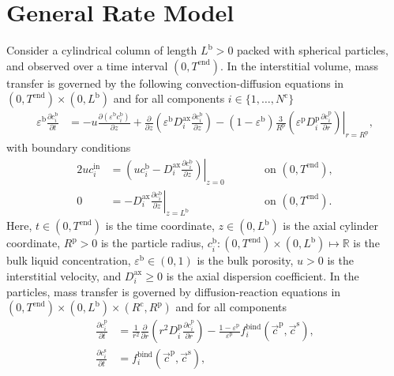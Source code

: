 \documentclass{article}
\begin{document}
\section*{General Rate Model}
Consider a cylindrical column of length $L^{\mathrm{b}} > 0$ packed with spherical particles, and observed over a time interval $(0, T^{\mathrm{end}})$.
In the interstitial volume, mass transfer is governed by the following convection-diffusion equations in $(0, T^{\mathrm{end}})\times (0, L^{\mathrm{b}})$ and for all components $i\in\{1, \dots, N^{\mathrm{c}} \}$
\begin{align}
    \varepsilon^{\mathrm{b}} \frac{\partial c^{\mathrm{b}}_{i}}{\partial t}
    &= - u \frac{\partial \left( \varepsilon^{\mathrm{b}} c^{\mathrm{b}}_{i} \right)}{\partial z}
        + \frac{\partial}{\partial z} \left( \varepsilon^{\mathrm{b}} D^{\mathrm{ax}}_{i} \frac{\partial c^{\mathrm{b}}_{i}}{\partial z} \right)
        - \left(1 - \varepsilon^{\mathrm{b}} \right) \frac{3}{R^{\mathrm{p}}} \left( \varepsilon^{\mathrm{p}} D^{\mathrm{p}}_{i} \left. \frac{\partial c^{\mathrm{p}}_{i}}{\partial r}\right)\right|_{r = R^{\mathrm{p}}},
\end{align}
with boundary conditions
\begin{alignat}{2}
    u c^{\mathrm{in}}_{i}
    &= \left.\left( u c^{\mathrm{b}}_{i} - D^{\mathrm{ax}}_{i} \frac{\partial c^{\mathrm{b}}_{i}}{\partial z}\right)\right|_{z=0}
    & & \qquad\text{on }(0, T^{\mathrm{end}}),
    \\
    0
    &= - D^{\mathrm{ax}}_{i} \left. \frac{\partial c^{\mathrm{b}}_{i}}{\partial z} \right|_{z=L^{\mathrm{b}}}
    & & \qquad\text{on }(0, T^{\mathrm{end}}).
\end{alignat}
Here, $t\in (0, T^{\mathrm{end}})$ is the time coordinate, $z\in (0, L^{\mathrm{b}})$ is the axial cylinder coordinate, $R^{\mathrm{p}}> 0$ is the particle radius, $c^{\mathrm{b}}_{i}\colon (0, T^{\mathrm{end}})\times (0, L^{\mathrm{b}}) \mapsto \mathbb{R}$ is the bulk liquid concentration, $\varepsilon^{\mathrm{b}}\in (0, 1)$ is the bulk porosity, $u> 0$ is the interstitial velocity, and $D^{\mathrm{ax}}_{i}\geq 0$ is the axial dispersion coefficient.
In the particles, mass transfer is governed by diffusion-reaction equations in $(0, T^{\mathrm{end}}) \times (0, L^{\mathrm{b}})\times (R^{\mathrm{c}}, R^{\mathrm{p}})$ and for all components
\begin{align}
    \frac{\partial c^{\mathrm{p}}_{i}}{\partial t}
    &= \frac{1}{r^{2}} \frac{\partial }{\partial r} \left( r^{2} D^{\mathrm{p}}_{i} \frac{\partial c^{\mathrm{p}}_{i}}{\partial r} \right)
        - \frac{1 - \varepsilon^{\mathrm{p}}}{\varepsilon^{\mathrm{p}}}f^{\mathrm{bind}}_{i}\left( \vec{c}^{\mathrm{p}}, \vec{c}^{\mathrm{s}} \right),
    \\
    \frac{\partial c^{\mathrm{s}}_{i}}{\partial t}
    &= f^{\mathrm{bind}}_{i}\left( \vec{c}^{\mathrm{p}}, \vec{c}^{\mathrm{s}} \right),
\end{align}
\end{document}
